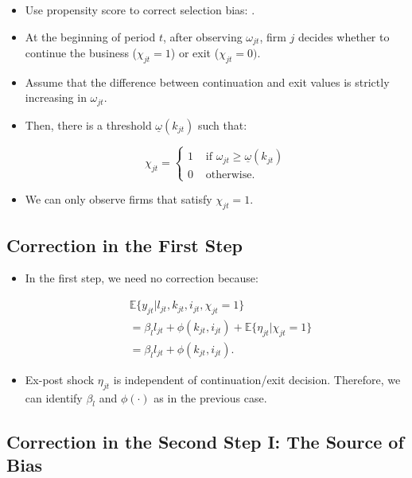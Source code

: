 \documentclass[]{book}
\providecommand{\tightlist}{%
  \setlength{\itemsep}{0pt}\setlength{\parskip}{0pt}}
\theoremstyle{definition}
\theoremstyle{definition}
\theoremstyle{definition}
\theoremstyle{remark}
\begin{document}
\begin{itemize}
\tightlist
\item
  Use propensity score to correct selection bias: \citet{Ahn1993}.
\item
  At the beginning of period \(t\), after observing \(\omega_{jt}\),
  firm \(j\) decides whether to continue the business
  (\(\chi_{jt} = 1\)) or exit (\(\chi_{jt} = 0)\).
\item
  Assume that the difference between continuation and exit values is
  strictly increasing in \(\omega_{jt}\).
\item
  Then, there is a threshold \(\underline{\omega}(k_{jt})\) such that:

  \begin{equation}
  \chi_{jt} = 
  \begin{cases}
  1 &\text{   if   } \omega_{jt} \ge \underline{\omega}(k_{jt})\\
  0 &\text{   otherwise.}
  \end{cases}
  \end{equation}
\item
  We can only observe firms that satisfy \(\chi_{jt} = 1\).
\end{itemize}

\subsection{Correction in the First
Step}\label{correction-in-the-first-step}

\begin{itemize}
\tightlist
\item
  In the first step, we need no correction because:

  \begin{equation}
  \begin{split}
  &\mathbb{E}\{y_{jt}|l_{jt}, k_{jt}, i_{jt}, \chi_{jt} = 1 \}\\
  &=\beta_l l_{jt} + \phi(k_{jt}, i_{jt}) + \mathbb{E}\{\eta_{jt}|\chi_{jt} = 1\}\\
  &= \beta_l l_{jt} + \phi(k_{jt}, i_{jt}).
  \end{split}
  \end{equation}
\item
  Ex-post shock \(\eta_{jt}\) is independent of continuation/exit
  decision. Therefore, we can identify \(\beta_l\) and \(\phi(\cdot)\)
  as in the previous case.
\end{itemize}

\subsection{Correction in the Second Step I: The Source of
Bias}\label{correction-in-the-second-step-i-the-source-of-bias}
\end{document}
